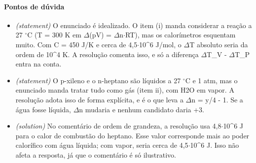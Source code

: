 \documentclass{article}%
\begin{document}
\paragraph{Pontos de dúvida}%
\begin{itemize}%
\item%
\textit{(statement)} O enunciado é idealizado. O item (i) manda considerar a reação a 27 $^\circ$C (T = 300 K em $\Delta$(pV) = $\Delta$n$\cdot$RT), mas os calorímetros esquentam muito. Com C = 450 J/K e cerca de 4,5$\cdot$10\^{}6 J/mol, o $\Delta$T absoluto seria da ordem de 10\^{}4 K. A resolução comenta isso, e só a diferença $\Delta$T\_V - $\Delta$T\_P entra na conta.%
\item%
\textit{(statement)} O p{-}xileno e o n{-}heptano são líquidos a 27 $^\circ$C e 1 atm, mas o enunciado manda tratar tudo como gás (item ii), com H2O em vapor. A resolução adota isso de forma explícita, e é o que leva a $\Delta$n = y/4 - 1. Se a água fosse líquida, $\Delta$n mudaria e nenhum candidato daria +3.%
\item%
\textit{(solution)} No comentário de ordem de grandeza, a resolução usa 4,8$\cdot$10\^{}6 J para o calor de combustão do heptano. Esse valor corresponde mais ao poder calorífico com água líquida; com vapor, seria cerca de 4,5$\cdot$10\^{}6 J. Isso não afeta a resposta, já que o comentário é só ilustrativo.%
\end{itemize}%
\end{document}
